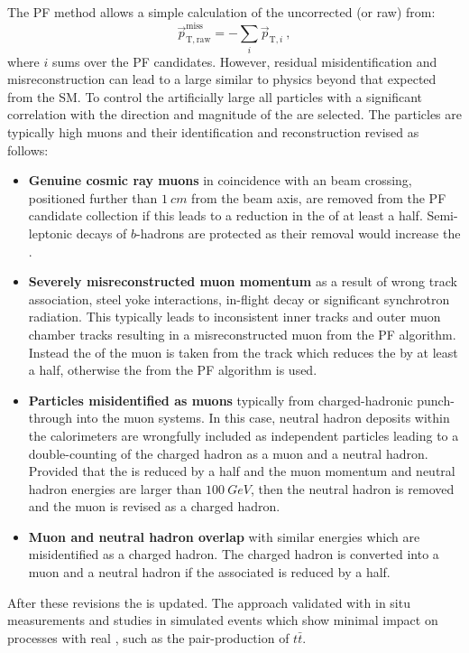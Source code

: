 The PF method allows a simple calculation of the uncorrected (or raw) \ptmiss
from:
%
\begin{equation}
    \vec{p}_{\mathrm{T,raw}}^{\mathrm{miss}} = - \sum_{i} \vec{p}_{\mathrm{T},i}\ ,
\end{equation}
%
where $i$ sums over the PF candidates. However, residual misidentification and
misreconstruction can lead to a large \ptmiss similar to physics beyond that expected from the SM. To control the artificially large \ptmiss all particles with a
significant correlation with the direction and magnitude of the \ptmiss are
selected. The particles are typically high \pt muons and their identification
and reconstruction revised as follows:
%
\begin{itemize}
    \item \textbf{Genuine cosmic ray muons} in coincidence with an \LHC beam crossing, positioned further than ${\SI{1}{cm}}$ from the beam axis, are removed from the PF candidate collection if this leads to a reduction in the \ptmiss of at least a half. Semi-leptonic decays of $b$-hadrons are protected as their removal would increase the \ptmiss. 
    \item \textbf{Severely misreconstructed muon momentum} as a result of wrong track association, steel yoke interactions, in-flight decay or significant synchrotron radiation. This typically leads to inconsistent inner tracks and outer muon chamber tracks resulting in a misreconstructed muon \pt from the PF algorithm. Instead the \pt of the muon is taken from the track which reduces the \ptmiss by at least a half, otherwise the \pt from the PF algorithm is used.
    \item \textbf{Particles misidentified as muons} typically from charged-hadronic punch-through into the muon systems. In this case, neutral hadron deposits within the calorimeters are wrongfully included as independent particles leading to a double-counting of the charged hadron as a muon and a neutral hadron. Provided that the \ptmiss is reduced by a half and the muon momentum and neutral hadron energies are larger than ${\SI{100}{GeV}}$, then the neutral hadron is removed and the muon is revised as a charged hadron.
    \item \textbf{Muon and neutral hadron overlap} with similar energies which are misidentified as a charged hadron. The charged hadron is converted into a muon and a neutral hadron if the associated \ptmiss is reduced by a half.
\end{itemize}
%
After these revisions the \ptmiss is updated. The approach validated with
in situ measurements and studies in simulated events which show minimal impact
on processes with real \ptmiss, such as the pair-production of $t\bar{t}$.



